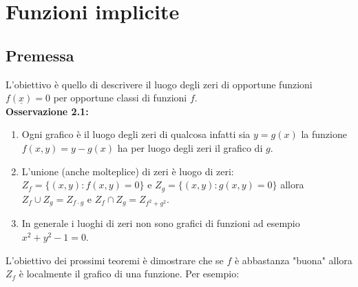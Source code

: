 \documentclass[a4paper,11pt,titlepage]{book}
\begin{document}
\chapter{Funzioni implicite}

\section{Premessa}

L'obiettivo è quello di descrivere il luogo degli zeri di opportune funzioni $f(\underline{x})=0$ per opportune classi di funzioni $f$.\\

\textbf{Osservazione 2.1:} \begin{enumerate}
\item Ogni grafico è il luogo degli zeri di qualcosa infatti sia $y=g(x)$ la funzione $f(x,y)=y-g(x)$ ha per luogo degli zeri il grafico di $g$.
\item L'unione (anche molteplice) di zeri è luogo di zeri: $Z_f=\{(x,y):f(x,y)=0\}$ e $Z_g=\{(x,y):g(x,y)=0\}$ allora $Z_f \cup Z_g = Z_{f\cdot g}$ e  $Z_f \cap Z_g = Z_{f^2+g^2}$.
\item In generale i luoghi di zeri non sono grafici di funzioni ad esempio $x^2+y^2-1=0$.
\end{enumerate}

L'obiettivo dei prossimi teoremi è dimostrare che se $f$ è abbastanza "buona" allora $Z_f$ è localmente il grafico di una funzione. Per esempio:\\

\begin{center}
\end{center}

\begin{center}
\end{center}
\end{document}
